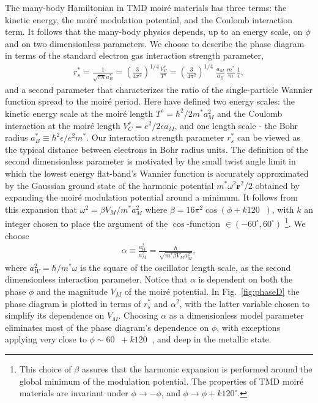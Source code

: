 \documentclass[%
 reprint,
 superscriptaddress,
 amsmath,amssymb,
 aps,
 prx,
 floatfix,
]{revtex4-2}
\newcommand{\<}{\langle}
\renewcommand{\>}{\rangle}
\renewcommand{\(}{\left(}
\renewcommand{\)}{\right)}
\renewcommand{\[}{\left[}
\renewcommand{\]}{\right]}
\renewcommand{\b}[1]{\mathbf{#1}} %
\DeclareMathOperator{\degree}{^{\circ}}
\begin{document}
The many-body Hamiltonian in TMD moir\'e materials has three terms: the kinetic energy,
the moir\'e modulation potential, and the Coulomb interaction term.  It follows that the 
many-body physics depends, up to an energy scale, on $\phi$ and on  two dimensionless parameters.
We choose to describe the phase diagram in terms of the standard electron gas interaction strength 
parameter,
\begin{align}
r_s^* = \frac{1}{\sqrt{\pi n}a_B^*} = \(\frac{3}{4\pi^2}\)^{1/4}\frac{V_C^s}{T^s} = \(\frac{3}{4\pi^2}\)^{1/4} \; \frac{a_M}{a_B} \, \frac{m^*}{m}\, \frac{1}{\epsilon}, \label{eq:rs}   
\end{align}
and a second parameter that characterizes the ratio of the single-particle Wannier function spread to the 
moir\'e period.  Here have defined two energy scales: the kinetic energy scale at the 
moir\'e length $T^s=\hbar^2/2m^*a_M^2$ and the Coulomb interaction at the 
moir\'e length $V_C^s = e^2/2\epsilon a_M$, and one length scale - the Bohr radius 
$a_B^* \equiv \hbar^2\epsilon/e^2m^*$.  Our interaction strength parameter 
$r_s^*$ can be viewed as the typical distance 
between electrons in Bohr radius units.  The definition of the second dimensionless parameter 
is motivated by the small twist angle limit in 
which the lowest energy flat-band's Wannier function is accurately approximated by the 
Gaussian ground state of the harmonic potential $m^*\omega^2\b{r}^2/2$ obtained by 
expanding the moir\'e modulation potential around a minimum.  It follows from this expansion that 
$\omega^2 = \beta V_M/m^*a_M^2$ where  
$\beta = 16\pi^2\cos(\phi+k 120\degree)$, with $k$ an integer chosen to place the argument of 
the $\cos$-function $ \in (-60^{\circ},60^{\circ})$
\footnote{This choice of $\beta$ assures that the harmonic expansion is 
performed around the global minimum of the modulation potential.  The properties of TMD
moir\'e materials are invariant under $\phi \to -\phi$, and $\phi \to \phi + k 120^{\circ}$.}.
We choose 
\begin{align}
\alpha \equiv \frac{a_W^2}{a_M^2} = \frac{\hbar}{\sqrt{m^*\beta V_Ma_M^2}},
\end{align}
where $a_W^2 = \hbar/m^*\omega$ is the square of the oscillator length scale, 
as the second dimensionless interaction parameter.
Notice that $\alpha$ is dependent on both the phase $\phi$ and the magnitude $V_M$ of the moir\'e potential. 
In Fig.~\ref{fig:phaseD} the phase diagram is plotted in terms of $r_s^*$ and $\alpha^2$, with the latter 
variable chosen to simplify its dependence on $V_M$.  Choosing $\alpha$ as a dimensionless model 
parameter eliminates most of the phase diagram's dependence on $\phi$, with exceptions applying very 
close to $\phi\sim 60\degree + k 120\degree$, and deep in the metallic state.
\end{document}
